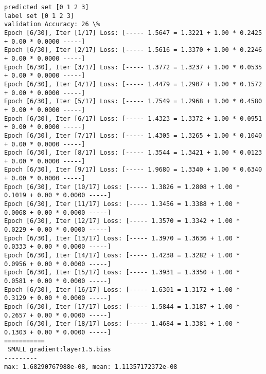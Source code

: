 \documentclass[11pt]{article}
\begin{document}
    \begin{Verbatim}[commandchars=\\\{\}]
predicted set [0 1 2 3]
label set [0 1 2 3]
validation Accuracy: 26 \%
Epoch [6/30], Iter [1/17] Loss: [----- 1.5647 = 1.3221 + 1.00 * 0.2425 + 0.00 * 0.0000 -----]
Epoch [6/30], Iter [2/17] Loss: [----- 1.5616 = 1.3370 + 1.00 * 0.2246 + 0.00 * 0.0000 -----]
Epoch [6/30], Iter [3/17] Loss: [----- 1.3772 = 1.3237 + 1.00 * 0.0535 + 0.00 * 0.0000 -----]
Epoch [6/30], Iter [4/17] Loss: [----- 1.4479 = 1.2907 + 1.00 * 0.1572 + 0.00 * 0.0000 -----]
Epoch [6/30], Iter [5/17] Loss: [----- 1.7549 = 1.2968 + 1.00 * 0.4580 + 0.00 * 0.0000 -----]
Epoch [6/30], Iter [6/17] Loss: [----- 1.4323 = 1.3372 + 1.00 * 0.0951 + 0.00 * 0.0000 -----]
Epoch [6/30], Iter [7/17] Loss: [----- 1.4305 = 1.3265 + 1.00 * 0.1040 + 0.00 * 0.0000 -----]
Epoch [6/30], Iter [8/17] Loss: [----- 1.3544 = 1.3421 + 1.00 * 0.0123 + 0.00 * 0.0000 -----]
Epoch [6/30], Iter [9/17] Loss: [----- 1.9680 = 1.3340 + 1.00 * 0.6340 + 0.00 * 0.0000 -----]
Epoch [6/30], Iter [10/17] Loss: [----- 1.3826 = 1.2808 + 1.00 * 0.1019 + 0.00 * 0.0000 -----]
Epoch [6/30], Iter [11/17] Loss: [----- 1.3456 = 1.3388 + 1.00 * 0.0068 + 0.00 * 0.0000 -----]
Epoch [6/30], Iter [12/17] Loss: [----- 1.3570 = 1.3342 + 1.00 * 0.0229 + 0.00 * 0.0000 -----]
Epoch [6/30], Iter [13/17] Loss: [----- 1.3970 = 1.3636 + 1.00 * 0.0333 + 0.00 * 0.0000 -----]
Epoch [6/30], Iter [14/17] Loss: [----- 1.4238 = 1.3282 + 1.00 * 0.0956 + 0.00 * 0.0000 -----]
Epoch [6/30], Iter [15/17] Loss: [----- 1.3931 = 1.3350 + 1.00 * 0.0581 + 0.00 * 0.0000 -----]
Epoch [6/30], Iter [16/17] Loss: [----- 1.6301 = 1.3172 + 1.00 * 0.3129 + 0.00 * 0.0000 -----]
Epoch [6/30], Iter [17/17] Loss: [----- 1.5844 = 1.3187 + 1.00 * 0.2657 + 0.00 * 0.0000 -----]
Epoch [6/30], Iter [18/17] Loss: [----- 1.4684 = 1.3381 + 1.00 * 0.1303 + 0.00 * 0.0000 -----]
===========
 SMALL gradient:layer1.5.bias
---------
max: 1.68290767988e-08, mean: 1.11357172372e-08

    \end{Verbatim}

    \begin{center}
    \end{center}
    { \hspace*{\fill} \\}
    
    \begin{center}
    \end{center}
    { \hspace*{\fill} \\}
    
\end{document}
